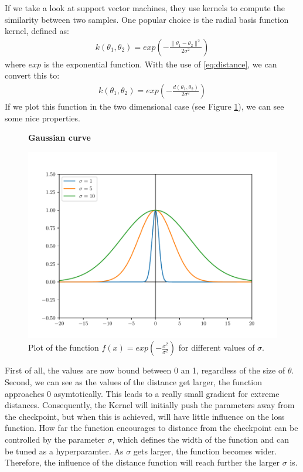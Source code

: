 If we take a look at support vector machines, they use kernels to compute the
similarity between two samples. One popular choice is the radial basis function
kernel, defined as:
\begin{align}\label{eq:RBF}
    k(\theta_1, \theta_2)=exp(-\frac{\rVert \theta_1 - \theta_2 \lVert^2}{2\sigma^2})
\end{align}
where $exp$ is the exponential function. With the use of \ref{eq:distance}, we
can convert this to:
\begin{align}\label{eq:DistanceFinal}
    k(\theta_1, \theta_2)=exp(-\frac{d(\theta_1, \theta_2)}{2\sigma^2})
\end{align}
If we plot this function in the two dimensional case (see Figure
\ref{fig:Gaussian}), we can see some nice properties.
\begin{figure}[h]\label{fig:Gaussian}
    \centering
    \textbf{Gaussian curve}\par\medskip
    \includegraphics[scale=0.5]{images/exponentail.pdf}
    \caption{Plot of the function $f(x)=exp(-\frac{x^2}{\sigma^2})$ for different values of $\sigma$.}
\end{figure}
First of all, the values are now bound between 0 an 1, regardless of the size of
$\theta$. Second, we can see as the values of the distance get larger, the
function approaches 0 asymtotically. This leads to a really small gradient for
extreme distances. Consequently, the Kernel will initially push the parameters
away from the checkpoint, but when this is achieved, will have little influence
on the loss function. How far the function encourages to distance from the
checkpoint can be controlled by the parameter $\sigma$, which defines the width
of the function and can be tuned as a hyperparamter. As $\sigma$ gets larger,
the function becomes wider. Therefore, the influence of the distance function
will reach further the larger $\sigma$ is.


